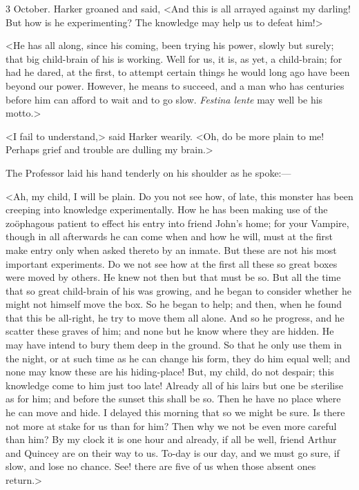 \begin{diary}{3 October.}
Harker groaned and said, <And this is all arrayed against my darling! But how is he experimenting? The knowledge may help us to defeat him!>

<He has all along, since his coming, been trying his power, slowly but surely; that big child-brain of his is working. Well for us, it is, as yet, a child-brain; for had he dared, at the first, to attempt certain things he would long ago have been beyond our power. However, he means to succeed, and a man who has centuries before him can afford to wait and to go slow. \textit{Festina lente} may well be his motto.>

<I fail to understand,> said Harker wearily. <Oh, do be more plain to me! Perhaps grief and trouble are dulling my brain.>

The Professor laid his hand tenderly on his shoulder as he spoke:—

<Ah, my child, I will be plain. Do you not see how, of late, this monster has been creeping into knowledge experimentally. How he has been making use of the zoöphagous patient to effect his entry into friend John's home; for your Vampire, though in all afterwards he can come when and how he will, must at the first make entry only when asked thereto by an inmate. But these are not his most important experiments. Do we not see how at the first all these so great boxes were moved by others. He knew not then but that must be so. But all the time that so great child-brain of his was growing, and he began to consider whether he might not himself move the box. So he began to help; and then, when he found that this be all-right, he try to move them all alone. And so he progress, and he scatter these graves of him; and none but he know where they are hidden. He may have intend to bury them deep in the ground. So that he only use them in the night, or at such time as he can change his form, they do him equal well; and none may know these are his hiding-place! But, my child, do not despair; this knowledge come to him just too late! Already all of his lairs but one be sterilise as for him; and before the sunset this shall be so. Then he have no place where he can move and hide. I delayed this morning that so we might be sure. Is there not more at stake for us than for him? Then why we not be even more careful than him? By my clock it is one hour and already, if all be well, friend Arthur and Quincey are on their way to us. To-day is our day, and we must go sure, if slow, and lose no chance. See! there are five of us when those absent ones return.>


\end{diary}
